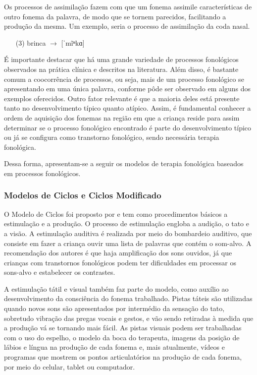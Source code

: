\documentclass[output=paper,colorlinks,citecolor=brown,booklanguage=portuguese]{langscibook}
\begin{document}
\newpage
Os processos de assimilação fazem com que um fonema assimile características de outro fonema da palavra, de modo que se tornem parecidos, facilitando a produção da mesma. Um exemplo, seria o processo de assimilação da coda nasal.

\begin{enumerate}
    \item [(3)]	brinca $\to$ [ˈmĩⁿkɑ]
\end{enumerate}

É importante destacar que há uma grande variedade de processos fonológicos observados na prática clínica e descritos na literatura. Além disso, é bastante comum a coocorrência de processos, ou seja, mais de um processo fonológico se apresentando em uma única palavra, conforme pôde ser observado em alguns dos exemplos oferecidos. Outro fator relevante é que a maioria deles está presente tanto no desenvolvimento típico quanto atípico. Assim, é fundamental conhecer a ordem de aquisição dos fonemas na região em que a criança reside para assim determinar se o processo fonológico encontrado é parte do desenvolvimento típico ou já se configura como transtorno fonológico, sendo necessária terapia fonológica.

Dessa forma, apresentam-se a seguir os modelos de terapia fonológica baseados em processos fonológicos.	

\subsubsection{Modelos de Ciclos e Ciclos Modificado}\label{sec:cap5secdoisumum}

O Modelo de Ciclos foi proposto por \citet{Hodson1983} e tem como procedimentos básicos a estimulação e a produção. O processo de estimulação engloba a audição, o tato e a visão. A estimulação auditiva é realizada por meio do bombardeio auditivo, que consiste em fazer a criança ouvir uma lista de palavras que contém o som-alvo. A recomendação dos autores é que haja amplificação dos sons ouvidos, já que crianças com transtornos fonológicos podem ter dificuldades em processar os sons-alvo e estabelecer os contrastes.

A estimulação tátil e visual também faz parte do modelo, como auxílio ao desenvolvimento da consciência do fonema trabalhado. Pistas táteis são utilizadas quando novos sons são apresentados por intermédio da sensação do tato, sobretudo vibração das pregas vocais e gestos, e vão sendo retiradas à medida que a produção vá se tornando mais fácil. As pistas visuais podem ser trabalhadas com o uso do espelho, o modelo da boca do terapeuta, imagens da posição de lábios e língua na produção de cada fonema e, mais atualmente, vídeos e programas que mostrem os pontos articulatórios na produção de cada fonema, por meio do celular, tablet ou computador.
\end{document}
